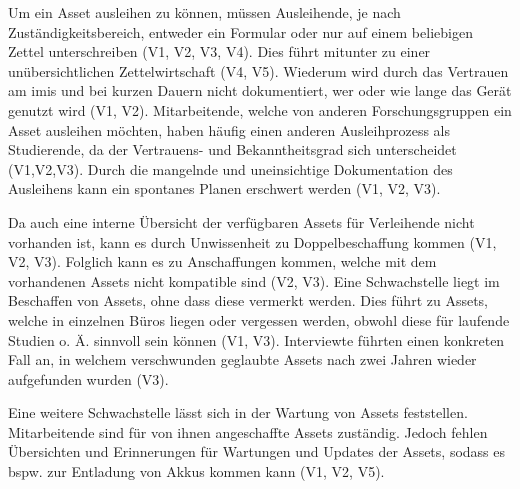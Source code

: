 Um ein Asset ausleihen zu können, müssen Ausleihende, je nach
Zuständigkeitsbereich, entweder ein Formular oder nur auf einem beliebigen
Zettel unterschreiben (V1, V2, V3, V4). Dies führt mitunter zu einer
unübersichtlichen Zettelwirtschaft (V4, V5). Wiederum wird durch das Vertrauen
am \ac{imis} und bei kurzen Dauern nicht dokumentiert, wer oder wie lange das
Gerät genutzt wird (V1, V2). Mitarbeitende, welche von anderen Forschungsgruppen
ein Asset ausleihen möchten, haben häufig einen anderen Ausleihprozess als
Studierende, da der Vertrauens- und Bekanntheitsgrad sich unterscheidet
(V1,V2,V3). Durch die mangelnde und uneinsichtige Dokumentation des Ausleihens
kann ein spontanes Planen erschwert werden (V1, V2, V3).

Da auch eine interne Übersicht der verfügbaren Assets für Verleihende nicht
vorhanden ist, kann es durch Unwissenheit zu Doppelbeschaffung kommen (V1, V2,
V3). Folglich kann es zu Anschaffungen kommen, welche mit dem vorhandenen Assets
nicht kompatible sind (V2, V3). Eine Schwachstelle liegt im Beschaffen von
Assets, ohne dass diese vermerkt werden. Dies führt zu Assets, welche in
einzelnen Büros liegen oder vergessen werden, obwohl diese für laufende Studien
o. Ä. sinnvoll sein können (V1, V3). Interviewte führten einen konkreten Fall an, in
welchem verschwunden geglaubte Assets nach zwei Jahren wieder aufgefunden
wurden (V3).

Eine weitere Schwachstelle lässt sich in der Wartung von Assets feststellen.
Mitarbeitende sind für von ihnen angeschaffte Assets zuständig.
Jedoch fehlen Übersichten und Erinnerungen für Wartungen und Updates der Assets,
sodass es bspw. zur Entladung von Akkus kommen kann (V1, V2, V5).

